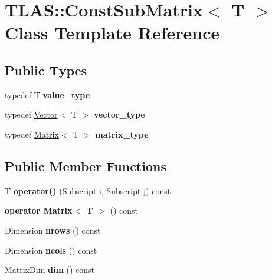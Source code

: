 \hypertarget{classTLAS_1_1ConstSubMatrix}{}\section{T\+L\+AS\+:\+:Const\+Sub\+Matrix$<$ T $>$ Class Template Reference}
\label{classTLAS_1_1ConstSubMatrix}
\subsection*{Public Types}
\begin{DoxyCompactItemize}
\item 
\mbox{\label{classTLAS_1_1ConstSubMatrix_a8b65c964e230e32c876de94fc085469b}} 
typedef T {\bfseries value\+\_\+type}
\item 
\mbox{\label{classTLAS_1_1ConstSubMatrix_ae193711f50b2937cd818fe4a4b71c4dc}} 
typedef \hyperlink{classTLAS_1_1Vector}{Vector}$<$ T $>$ {\bfseries vector\+\_\+type}
\item 
\mbox{\label{classTLAS_1_1ConstSubMatrix_a4400793cf57c8dd1c96028e2bdced85e}} 
typedef \hyperlink{classTLAS_1_1Matrix}{Matrix}$<$ T $>$ {\bfseries matrix\+\_\+type}
\end{DoxyCompactItemize}
\subsection*{Public Member Functions}
\begin{DoxyCompactItemize}
\item 
\mbox{\label{classTLAS_1_1ConstSubMatrix_a53d63cd02b0e70a2a4590303f8d23624}} 
T {\bfseries operator()} (Subscript i, Subscript j) const
\item 
\mbox{\label{classTLAS_1_1ConstSubMatrix_ac92b5ac8a595494a19779540b3c241a4}} 
{\bfseries operator Matrix$<$ T $>$} () const
\item 
\mbox{\label{classTLAS_1_1ConstSubMatrix_a48e08e979b2416fa3c560fa85a8efe52}} 
Dimension {\bfseries nrows} () const
\item 
\mbox{\label{classTLAS_1_1ConstSubMatrix_a57b0802f01e8e8e8f8ae2b394823508a}} 
Dimension {\bfseries ncols} () const
\item 
\mbox{\label{classTLAS_1_1ConstSubMatrix_a7a9bb970ebcd2fca652a97711889acce}} 
\hyperlink{structTLAS_1_1MatrixDim}{Matrix\+Dim} {\bfseries dim} () const
\end{DoxyCompactItemize}
